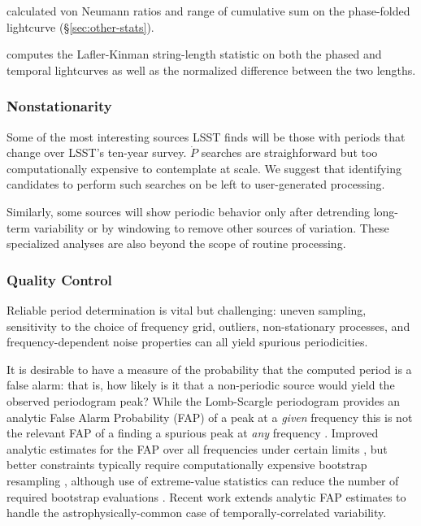 \documentclass[DM,authoryear,toc]{lsstdoc}
\begin{document}
\citet{Kim:14:The-EPOCH-Proje} calculated von Neumann ratios and range of cumulative sum on the phase-folded lightcurve (\S \ref{sec:other-stats}).

\citet{Jayasinghe:19:ASASSNVarsIII} computes the Lafler-Kinman string-length statistic on both the phased and temporal lightcurves as well as the normalized difference between the two lengths.



\subsubsection{Nonstationarity}

Some of the most interesting sources LSST finds will be those with periods that change over LSST's ten-year survey.
$\dot{P}$ searches are straighforward but too computationally expensive to contemplate at scale.
We suggest that identifying candidates to perform such searches on be left to user-generated processing.

Similarly, some sources will show periodic behavior only after detrending long-term variability or by windowing to remove other sources of variation.  
These specialized analyses are also beyond the scope of routine processing.

\subsubsection{Quality Control}

Reliable period determination is vital but challenging: uneven sampling, sensitivity to the choice of frequency grid, outliers, non-stationary processes, and frequency-dependent noise properties can all yield spurious periodicities.

It is desirable to have a measure of the probability that the computed period is a false alarm:  that is, how likely is it that a non-periodic source would yield the observed periodogram peak?
While the Lomb-Scargle periodogram provides an analytic False Alarm Probability (FAP) of a peak at a \textit{given} frequency \citep{Scargle:82:Studies-in-astr} this is not the relevant FAP of a finding a spurious peak at \textit{any} frequency \citep[and references therein]{VanderPlas:18:UnderstandingLS}.
Improved analytic estimates for the FAP over all frequencies under certain limits \citep{Baluev:08:FAP}, but better constraints typically require computationally expensive bootstrap resampling \citep[e.g.,][]{Ivezic:14:MLBook}, although use of extreme-value statistics can reduce the number of required bootstrap evaluations \citep{Suveges:12:FAP}.
Recent work \citep{Delisle:20:LSFAPCorrelatedNoise} extends analytic FAP estimates to handle the astrophysically-common case of temporally-correlated variability.
\end{document}
